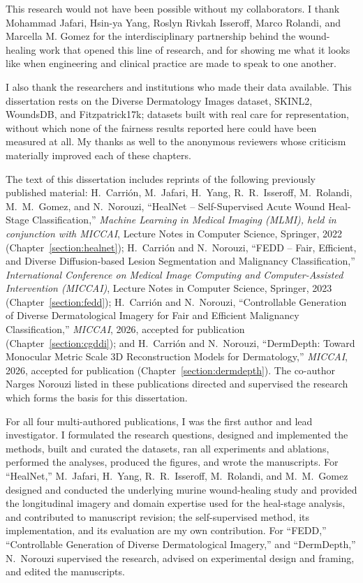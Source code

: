 \documentclass[11pt]{ucthesis}
\begin{document}
\begin{frontmatter}
\begin{acknowledgements}
This research would not have been possible without my collaborators. I thank Mohammad
Jafari, Hsin-ya Yang, Roslyn Rivkah Isseroff, Marco Rolandi, and Marcella M. Gomez for
the interdisciplinary partnership behind the wound-healing work that opened this line of
research, and for showing me what it looks like when engineering and clinical practice
are made to speak to one another.

I also thank the researchers and institutions who made their data available. This
dissertation rests on the Diverse Dermatology Images dataset, SKINL2, WoundsDB, and
Fitzpatrick17k; datasets built with real care for representation, without which none of
the fairness results reported here could have been measured at all. My thanks as well to
the anonymous reviewers whose criticism materially improved each of these chapters.

The text of this dissertation includes reprints of the following previously published
material: H.~Carrión, M.~Jafari, H.~Yang, R.~R.~Isseroff, M.~Rolandi, M.~M.~Gomez, and
N.~Norouzi, ``HealNet -- Self-Supervised Acute Wound Heal-Stage Classification,''
\emph{Machine Learning in Medical Imaging (MLMI), held in conjunction with MICCAI},
Lecture Notes in Computer Science, Springer, 2022 (Chapter~\ref{section:healnet});
H.~Carrión and N.~Norouzi, ``FEDD -- Fair, Efficient, and Diverse Diffusion-based Lesion
Segmentation and Malignancy Classification,'' \emph{International Conference on Medical
Image Computing and Computer-Assisted Intervention (MICCAI)}, Lecture Notes in Computer
Science, Springer, 2023 (Chapter~\ref{section:fedd}); H.~Carrión and N.~Norouzi,
``Controllable Generation of Diverse Dermatological Imagery for Fair and Efficient
Malignancy Classification,'' \emph{MICCAI}, 2026, accepted for publication
(Chapter~\ref{section:cgddi}); and H.~Carrión and N.~Norouzi, ``DermDepth: Toward
Monocular Metric Scale 3D Reconstruction Models for Dermatology,'' \emph{MICCAI}, 2026,
accepted for publication (Chapter~\ref{section:dermdepth}). The co-author Narges Norouzi
listed in these publications directed and supervised the research which forms the basis
for this dissertation.

For all four multi-authored publications, I was the first author and lead investigator.
I formulated the research questions, designed and implemented the methods, built and
curated the datasets, ran all experiments and ablations, performed the analyses, produced
the figures, and wrote the manuscripts. For ``HealNet,'' M.~Jafari, H.~Yang,
R.~R.~Isseroff, M.~Rolandi, and M.~M.~Gomez designed and conducted the underlying murine
wound-healing study and provided the longitudinal imagery and domain expertise used for
the heal-stage analysis, and contributed to manuscript revision; the self-supervised
method, its implementation, and its evaluation are my own contribution. For ``FEDD,''
``Controllable Generation of Diverse Dermatological Imagery,'' and ``DermDepth,''
N.~Norouzi supervised the research, advised on experimental design and framing, and
edited the manuscripts.


\end{acknowledgements}
\end{frontmatter}
\end{document}
